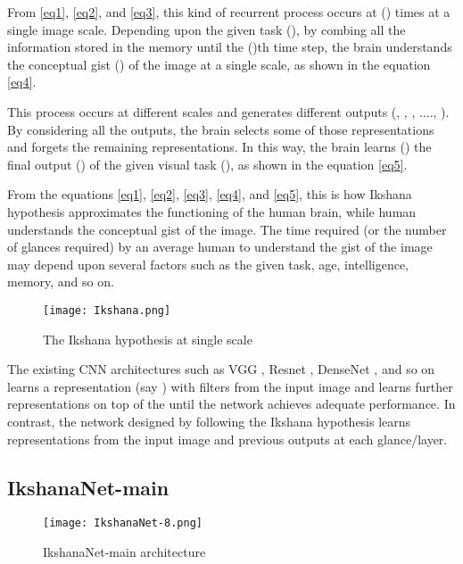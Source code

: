 \documentclass{article}
\begin{document}
From \ref{eq1}, \ref{eq2}, and \ref{eq3}, this kind of recurrent process occurs at () times at a single image scale. Depending upon the given task (), by combing all the information stored in the memory until the ()th time step, the brain understands the conceptual gist () of the image at a single scale, as shown in the equation \ref{eq4}. 

This process occurs at  different scales and generates  different outputs (, , , ...., ). By considering all the outputs, the brain selects some of those representations and forgets the remaining representations. In this way, the brain learns () the final output () of the given visual task (), as shown in the equation \ref{eq5}.

From the equations \ref{eq1}, \ref{eq2}, \ref{eq3}, \ref{eq4}, and \ref{eq5}, this is how Ikshana hypothesis approximates the functioning of the human brain, while human understands the conceptual gist of the image.
The time required (or the number of glances required) by an average human to understand the gist of the image may depend upon several factors such as the given task, age, intelligence, memory, and so on. 
\begin{figure}[ht]
\begin{center}
   \texttt{[image: Ikshana.png]}
\end{center}
   \caption{The Ikshana hypothesis at single scale}
\label{fig:ikshana}
\end{figure}

\noindent The existing CNN architectures such as VGG \cite{simonyan2014very}, Resnet \cite{he2016deep}, DenseNet \cite{huang2017densely}, and so on learns a representation (say ) with  filters from the input image and learns further representations on top of the  until the network achieves adequate performance. In contrast, the network designed by following the Ikshana hypothesis learns representations from the input image and previous outputs at each glance/layer.



\subsection{IkshanaNet-main}
\label{3.2}
\begin{figure}[ht]
\begin{center}
   \texttt{[image: IkshanaNet-8.png]}
\end{center}
   \caption{IkshanaNet-main architecture}
\label{fig:IkshanaNet}
\end{figure}
\end{document}
